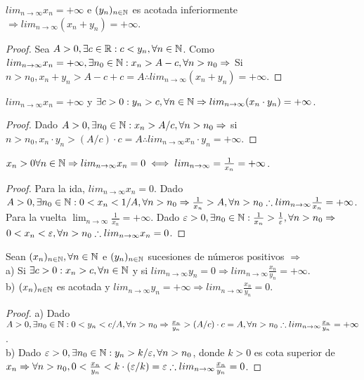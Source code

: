 \begin{prop}
  $lim_{n \to \infty} x_n = + \infty$ e $(y_n)_{n \in \mathbb{N}}$ es acotada inferiormente $\Rightarrow lim_{n \to \infty} (x_n + y_n) = +\infty$.
  \begin{proof}
    Sea $A > 0, \exists c \in \mathbb{R} : c < y_n, \forall n \in \mathbb{N}$.
    Como $lim_{n \to \infty} x_n = + \infty, \exists n_0 \in \mathbb{N} : x_n > A - c, \forall n > n_0 \Rightarrow$
    Si $n > n_0, x_n + y_n > A - c + c = A \therefore lim_{n \to \infty} (x_n + y_n) = +\infty$.
  \end{proof}
\end{prop}

\begin{prop}
  $lim_{n \to \infty} x_n = +\infty$ y $\exists c > 0 : y_n > c, \forall n \in \mathbb{N} \Rightarrow lim_{n \to \infty} (x_n \cdot y_n) = + \infty$.
  \begin{proof}
    Dado $A > 0, \exists n_0 \in \mathbb{N} : x_n > A/c, \forall n > n_0 \Rightarrow$ si $n > n_0, x_n \cdot y_n > (A/c) \cdot c = A \therefore lim_{n \to \infty} x_n \cdot y_n = + \infty$.
  \end{proof}
\end{prop}


\begin{prop}
  $x_n > 0 \forall n \in \mathbb{N} \Rightarrow lim_{n \to \infty} x_n = 0 \iff lim_{n \to \infty} = \frac{1}{x_n} = +\infty$.
  \begin{proof}
    Para la ida, $lim_{n \to \infty} x_n = 0$. Dado $A > 0, \exists n_0 \in \mathbb{N} : 0 < x_n < 1/A, \forall n > n_0 \Rightarrow \frac{1}{x_n} > A, \forall n > n_0 \therefore lim_{n \to \infty} \frac{1}{x_n} = +\infty$. \\
    Para la vuelta $\lim_{n \to \infty} \frac{1}{x_n} = +\infty$. Dado $\varepsilon > 0, \exists n_0 \in \mathbb{N} : \frac{1}{x_n} > \frac{1}{\varepsilon}, \forall n > n_0 \Rightarrow$ \\
    $0 < x_n < \varepsilon, \forall n > n_0 \therefore lim_{n \to \infty} x_n = 0$.
  \end{proof}
\end{prop}

\begin{prop}
  Sean $(x_n)_{n \in \mathbb{N}}, \forall n \in \mathbb{N}$ e $(y_n)_{n \in \mathbb{N}}$ sucesiones de números positivos $\Rightarrow$ \\
  a) Si $\exists c > 0 : x_n > c, \forall n \in \mathbb{N}$ y si $lim_{n \to \infty} y_n = 0 \Rightarrow lim_{n \to \infty} \frac{x_n}{y_n} = +\infty$. \\
  b) $(x_n)_{n \in \mathbb{N}}$ es acotada y $lim_{n \to \infty} y_n = +\infty \Rightarrow lim_{n \to \infty} \frac{x_n}{y_n} = 0$.
  \begin{proof}
    a) Dado $A > 0, \exists n_0 \in \mathbb{N} : 0 < y_n < c/A, \forall n > n_0 \Rightarrow \frac{x_n}{y_n} > (A/c) \cdot c = A, \forall n > n_0 \therefore lim_{n \to \infty} \frac{x_n}{y_n} = + \infty$. \\
    b) Dado $\varepsilon > 0, \exists n_0 \in \mathbb{N} : y_n > k/\varepsilon, \forall n > n_0$, donde $k > 0$ es cota superior de $x_n \Rightarrow \forall n > n_0, 0 < \frac{x_n}{y_n} < k \cdot (\varepsilon/k) = \varepsilon \therefore lim_{n \to \infty} \frac{x_n}{y_n} = 0$.  
  \end{proof}
\end{prop}


